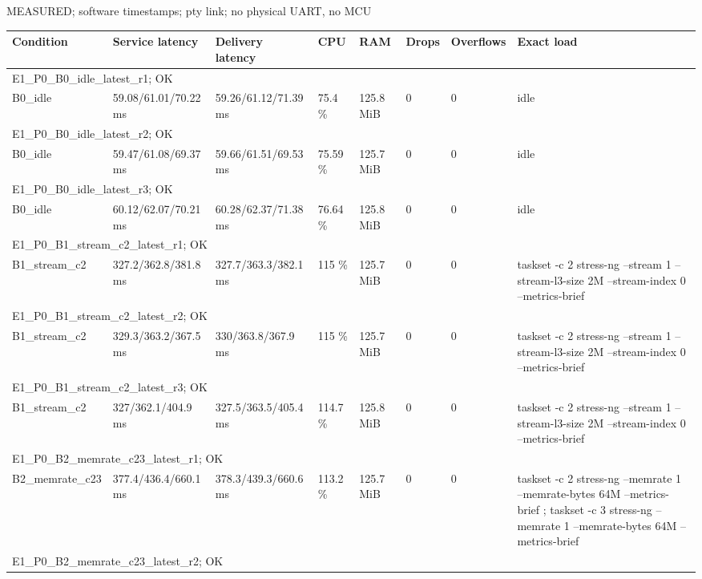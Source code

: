 \par\noindent MEASURED; software timestamps; pty link; no physical UART, no MCU\par
\begin{tabular}{llllllll}
\toprule
Condition & Service latency & Delivery latency & CPU & RAM & Drops & Overflows & Exact load \\
\midrule
\multicolumn{8}{l}{E1\_P0\_B0\_idle\_latest\_r1; OK} \\
B0\_idle & 59.08/61.01/70.22 ms & 59.26/61.12/71.39 ms & 75.4 \% & 125.8 MiB & 0 & 0 & idle \\
\multicolumn{8}{l}{E1\_P0\_B0\_idle\_latest\_r2; OK} \\
B0\_idle & 59.47/61.08/69.37 ms & 59.66/61.51/69.53 ms & 75.59 \% & 125.7 MiB & 0 & 0 & idle \\
\multicolumn{8}{l}{E1\_P0\_B0\_idle\_latest\_r3; OK} \\
B0\_idle & 60.12/62.07/70.21 ms & 60.28/62.37/71.38 ms & 76.64 \% & 125.8 MiB & 0 & 0 & idle \\
\multicolumn{8}{l}{E1\_P0\_B1\_stream\_c2\_latest\_r1; OK} \\
B1\_stream\_c2 & 327.2/362.8/381.8 ms & 327.7/363.3/382.1 ms & 115 \% & 125.7 MiB & 0 & 0 & taskset -c 2 stress-ng --stream 1 --stream-l3-size 2M --stream-index 0 --metrics-brief \\
\multicolumn{8}{l}{E1\_P0\_B1\_stream\_c2\_latest\_r2; OK} \\
B1\_stream\_c2 & 329.3/363.2/367.5 ms & 330/363.8/367.9 ms & 115 \% & 125.7 MiB & 0 & 0 & taskset -c 2 stress-ng --stream 1 --stream-l3-size 2M --stream-index 0 --metrics-brief \\
\multicolumn{8}{l}{E1\_P0\_B1\_stream\_c2\_latest\_r3; OK} \\
B1\_stream\_c2 & 327/362.1/404.9 ms & 327.5/363.5/405.4 ms & 114.7 \% & 125.8 MiB & 0 & 0 & taskset -c 2 stress-ng --stream 1 --stream-l3-size 2M --stream-index 0 --metrics-brief \\
\multicolumn{8}{l}{E1\_P0\_B2\_memrate\_c23\_latest\_r1; OK} \\
B2\_memrate\_c23 & 377.4/436.4/660.1 ms & 378.3/439.3/660.6 ms & 113.2 \% & 125.7 MiB & 0 & 0 & taskset -c 2 stress-ng --memrate 1 --memrate-bytes 64M --metrics-brief ; taskset -c 3 stress-ng --memrate 1 --memrate-bytes 64M --metrics-brief \\
\multicolumn{8}{l}{E1\_P0\_B2\_memrate\_c23\_latest\_r2; OK} \\

\end{tabular}
